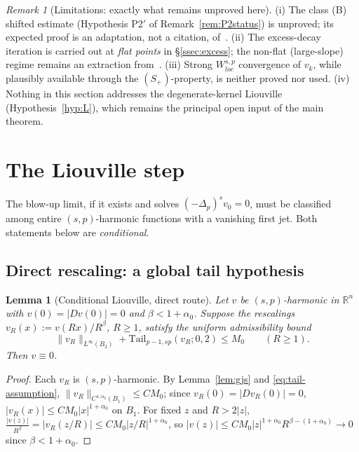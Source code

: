 \documentclass[11pt]{amsart}
\theoremstyle{plain}
\newtheorem{lemma}[theorem]{Lemma}
\theoremstyle{definition}
\theoremstyle{remark}
\newtheorem{remark}[theorem]{Remark}
\newcommand{\R}{\mathbb{R}}
\newcommand{\fpl}[1]{(-\Delta_p)^{s}#1}
\newcommand{\al}{\alpha}
\newcommand{\Tail}{\mathrm{Tail}_{p-1,sp}}
\begin{document}
\begin{remark}[Limitations: exactly what remains unproved here]
\label{rem:P1-limits}
\textnormal{(i)} The class \textnormal{(B)} shifted estimate
\textnormal{(}Hypothesis P2$'$ of Remark~\ref{rem:P2status}\textnormal{)}
is unproved; its expected proof is
an adaptation, not a citation, of~\cite{GJS}. \textnormal{(ii)} The
excess-decay iteration is carried out at \emph{flat points} in
\S\ref{ssec:excess}; the non-flat (large-slope) regime remains an
extraction from~\cite{GJS}. \textnormal{(iii)} Strong $W^{s,p}_{loc}$
convergence of $v_k$, while plausibly available through the
$(S_+)$-property, is neither proved nor used. \textnormal{(iv)} Nothing in
this section addresses the degenerate-kernel Liouville
\textnormal{(}Hypothesis~\ref{hyp:L}\textnormal{)}, which remains the
principal open input of the main theorem.
\end{remark}

\section{The Liouville step}\label{sec:liouville}
The blow-up limit, if it exists and solves $\fpl{v_0}=0$, must be classified
among entire $(s,p)$-harmonic functions with a vanishing first jet. Both
statements below are \emph{conditional}.

\subsection{Direct rescaling: a global tail hypothesis}
\begin{lemma}[Conditional Liouville, direct route]\label{lem:liouville-cond}
Let $v$ be $(s,p)$-harmonic in $\R^n$ with $v(0)=|Dv(0)|=0$ and
$\beta<1+\al_0$. Suppose the rescalings $v_R(x):=v(Rx)/R^{\beta}$, $R\ge1$,
satisfy the uniform admissibility bound
\begin{equation}\label{eq:tail-assumption}
  \|v_R\|_{L^\infty(B_2)}+\Tail(v_R;0,2)\le M_0\qquad(R\ge1).
\end{equation}
Then $v\equiv0$.
\end{lemma}
\begin{proof}
Each $v_R$ is $(s,p)$-harmonic. By Lemma~\ref{lem:gjs} and
\eqref{eq:tail-assumption}, $\|v_R\|_{C^{1,\al_0}(B_1)}\le CM_0$; since
$v_R(0)=|Dv_R(0)|=0$, $|v_R(x)|\le CM_0|x|^{1+\al_0}$ on $B_1$. For fixed $z$
and $R>2|z|$, $\frac{|v(z)|}{R^{\beta}}=|v_R(z/R)|\le CM_0|z/R|^{1+\al_0}$, so
$|v(z)|\le CM_0|z|^{1+\al_0}R^{\beta-(1+\al_0)}\to0$ since $\beta<1+\al_0$.
\end{proof}
\end{document}
